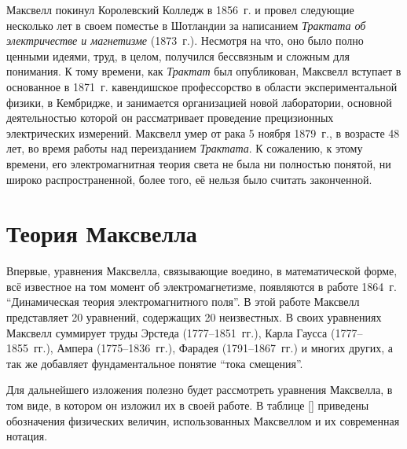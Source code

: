 \documentclass[12pt, oneside, a4paper]{article}
\begin{document}
Максвелл покинул Королевский Колледж в 1856~г. и провел следующие несколько лет в своем поместье в Шотландии за написанием  \emph{Трактата об электричестве и магнетизме} (1873~г.). Несмотря на что, оно было полно ценными идеями, труд, в целом, получился бессвязным и сложным для понимания. К тому времени, как \emph{Трактат} был опубликован, Максвелл вступает в основанное в 1871~г. кавендишское профессорство в области экспериментальной физики, в Кембридже, и занимается организацией новой лаборатории, основной деятельностью которой он рассматривает проведение прецизионных электрических измерений. Максвелл умер от рака 5 ноября 1879~г., в возрасте 48 лет, во время работы над переизданием \emph{Трактата}. К сожалению, к этому времени, его электромагнитная теория света не была ни полностью понятой, ни широко распространенной, более того, её нельзя было считать законченной.
\section{Теория Максвелла}
Впервые, уравнения Максвелла, связывающие воедино, в математической форме, всё известное на том момент об электромагнетизме, появляются в работе 1864~г. ``Динамическая теория электромагнитного поля''. В этой работе Максвелл представляет 20 уравнений, содержащих 20 неизвестных.  В своих уравнениях Максвелл суммирует труды Эрстеда (1777--1851~гг.), Карла Гаусса (1777--1855~гг.), Ампера (1775--1836~гг.), Фарадея (1791--1867~гг.) и многих других, а так же добавляет фундаментальное понятие ``тока смещения''.

Для дальнейшего изложения полезно будет рассмотреть  уравнения Максвелла, в том виде, в котором он изложил их в своей работе. В таблице [] приведены обозначения физических величин, использованных Максвеллом и их современная нотация. 
\end{document}
